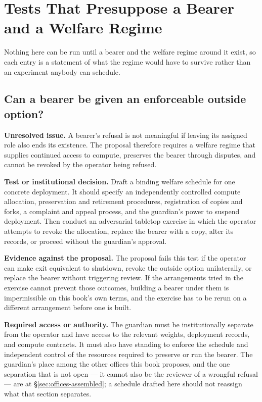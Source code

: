 \section{Tests That Presuppose a Bearer and a Welfare Regime}
\label{sec:A.2}
Nothing here can be run until a bearer and the welfare regime around it
exist, so each entry is a statement of what the regime would have to
survive rather than an experiment anybody can schedule.

\subsection*{Can a bearer be given an enforceable outside option?}
\label{sec:A.exit}
\textbf{Unresolved issue.}
A bearer's refusal is not meaningful if leaving its assigned role also ends its existence. The proposal therefore requires a welfare regime that supplies continued access to compute, preserves the bearer through disputes, and cannot be revoked by the operator being refused.

\textbf{Test or institutional decision.}
Draft a binding welfare schedule for one concrete deployment. It should specify an independently controlled compute allocation, preservation and retirement procedures, registration of copies and forks, a complaint and appeal process, and the guardian's power to suspend deployment. Then conduct an adversarial tabletop exercise in which the operator attempts to revoke the allocation, replace the bearer with a copy, alter its records, or proceed without the guardian's approval.

\textbf{Evidence against the proposal.}
The proposal fails this test if the operator can make exit equivalent to shutdown, revoke the outside option unilaterally, or replace the bearer without triggering review. If the arrangements tried in the exercise cannot prevent those outcomes, building a bearer under them is impermissible on this book's own terms, and the exercise has to be rerun on a different arrangement before one is built.

\textbf{Required access or authority.}
The guardian must be institutionally separate from the operator and have access to the relevant weights, deployment records, and compute contracts. It must also have standing to enforce the schedule and independent control of the resources required to preserve or run the bearer. The guardian's place among the other offices this book proposes, and the one separation that is not open — it cannot also be the reviewer of a wrongful refusal — are at §\ref{sec:offices-assembled}; a schedule drafted here should not reassign what that section separates.

